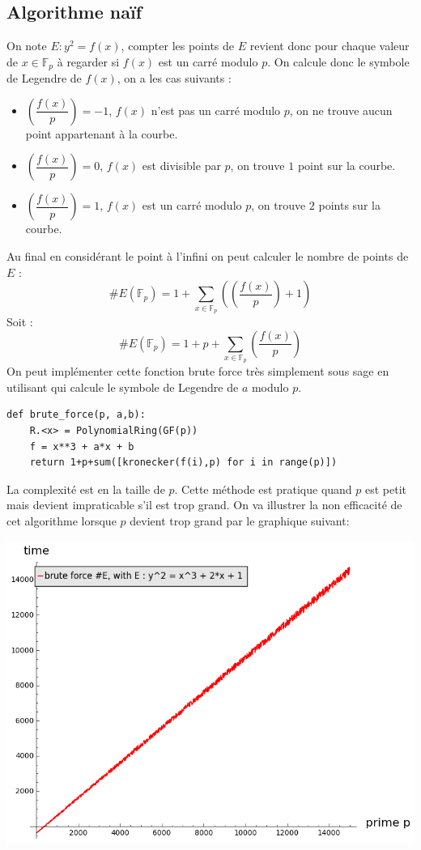 \documentclass{article}
\begin{document}
\subsection{Algorithme naïf}
On note $E: y^2 = f(x)$, compter les points de $E$ revient donc pour chaque valeur de $x \in \mathbb{F}_p$ à regarder si $f(x)$ est un carré modulo $p$. On calcule donc le symbole de Legendre de $f(x)$, on a les cas suivants : 
\begin{itemize}
\item  $\genfrac(){}{0}{f(x)}{p} = -1$, $f(x)$ n'est pas un carré modulo $p$, on ne trouve aucun point appartenant à la courbe.
\item $\genfrac(){}{0}{f(x)}{p} = 0$, $f(x)$ est divisible par $p$, on trouve $1$ point sur la courbe.
\item $\genfrac(){}{0}{f(x)}{p} = 1$, $f(x)$ est un carré modulo $p$, on trouve $2$ points sur la courbe.
\end{itemize}
\medskip
Au final en considérant le point à l'infini on peut calculer le nombre de points de $E$ : 
\begin{equation*}
\#E(\mathbb{F}_p) = 1 + \sum_{x \in \mathbb{F}_p}(\genfrac(){}{0}{f(x)}{p} + 1)
\end{equation*}
Soit : 
\begin{equation}
\#E(\mathbb{F}_p) = 1 + p +\sum_{x \in \mathbb{F}_p}\genfrac(){}{0}{f(x)}{p}
\end{equation}
On peut implémenter cette fonction brute force très simplement sous sage en utilisant  qui calcule le symbole de Legendre de $a$ modulo $p$.
\medskip
\begin{lstlisting}
def brute_force(p, a,b):
    R.<x> = PolynomialRing(GF(p))
    f = x**3 + a*x + b
    return 1+p+sum([kronecker(f(i),p) for i in range(p)])

\end{lstlisting}

\bigskip
La complexité est en la taille de $p$. Cette méthode est pratique quand $p$ est petit mais devient impraticable s'il est trop grand.
On va illustrer la non efficacité de cet algorithme lorsque $p$ devient trop grand par le graphique suivant:

\includegraphics[scale=0.5]{pictures/brute_force_cputime.png} 
\end{document}
